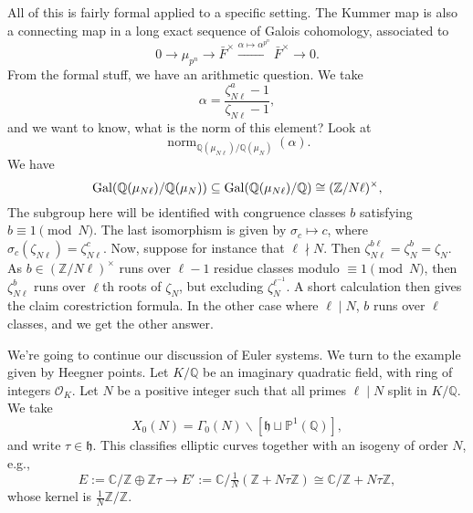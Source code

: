\documentclass[reqno]{amsart} 
\numberwithin{theorem}{section}
\numberwithin{equation}{section}
\numberwithin{exercise}{section}
\begin{document}
\begin{remark}
  All of this is fairly formal applied to a specific setting.  The Kummer map is also a connecting map in a long exact sequence of Galois cohomology, associated to
  \begin{equation*}
    0 \rightarrow \mu_{p^n} \rightarrow \bar{F}^\times \xrightarrow{\alpha \mapsto \alpha^{p^n}} \bar{F}^\times \rightarrow 0.
  \end{equation*}
  From the formal stuff, we have an arithmetic question.  We take
  \begin{equation*}
    \alpha = \frac{\zeta_{N \ell}^a - 1}{\zeta_{N \ell} - 1},
  \end{equation*}
  and we want to know, what is the norm of this element?  Look at
  \begin{equation*}
    \operatorname{norm}_{\mathbb{Q}(\mu_{N \ell}) / \mathbb{Q}(\mu_N)}(\alpha).
  \end{equation*}
  We have
  \begin{equation*}
    \operatorname{Gal}(\mathbb{Q}(\mu_{N \ell}) / \mathbb{Q}(\mu_N))
    \subseteq \operatorname{Gal}(\mathbb{Q}(\mu_{N \ell}) / \mathbb{Q})
    \cong(\mathbb{Z} / N \ell)^\times,
  \end{equation*}
  The subgroup here will be identified with congruence classes $b$ satisfying $b \equiv 1 \pmod{N}$.  The last isomorphism is given by $\sigma_c \mapsto c$, where $\sigma_c(\zeta_{N \ell}) = \zeta_{N \ell}^c$.  Now, suppose for instance that $\ell \nmid N$.  Then $\zeta_{N \ell}^{b \ell} = \zeta_N^b = \zeta_N$.  As $b \in(\mathbb{Z} / N \ell )^\times$ runs over $\ell - 1$ residue classes modulo $\equiv 1 \pmod{N}$, then $\zeta_{N \ell}^b$ runs over $\ell$th roots of $\zeta_N$, but excluding $\zeta_N^{\ell^{-1}}$.  A short calculation then gives the claim corestriction formula.  In the other case where $\ell \mid N$, $b$ runs over $\ell$ classes, and we get the other answer.
\end{remark}

We're going to continue our discussion of Euler systems.  We turn to the example given by Heegner points.  Let $K / \mathbb{Q}$ be an imaginary quadratic field, with ring of integers $\mathcal{O}_K$.  Let $N$ be a positive integer such that all primes $\ell \mid N$ split in $K /\mathbb{Q}$.  We take
\begin{equation*}
  X_0(N) = \Gamma_0(N) \backslash[\mathfrak{h} \sqcup \mathbb{P}^1(\mathbb{Q})],
\end{equation*}
and write $\tau \in \mathfrak{h}$.  This classifies elliptic curves together with an isogeny of order $N$, e.g.,
\begin{equation*}
  E := \mathbb{C} / \mathbb{Z} \oplus \mathbb{Z} \tau \rightarrow E' :=  \mathbb{C} / \tfrac{1}{N}(\mathbb{Z} + N \tau \mathbb{Z}) \cong \mathbb{C} / \mathbb{Z} + N \tau \mathbb{Z},
\end{equation*}
whose kernel is $\tfrac{1}{N} \mathbb{Z} / \mathbb{Z}$.
\end{document}
